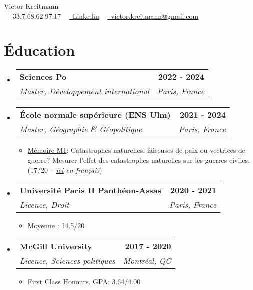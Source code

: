 \documentclass[a4paper,11pt]{article}
\makeatletter
\newcommand{\resumeItem}[1]{
  \item\small{
    {#1 \vspace{-2pt}}
  }
}
\newcommand{\resumeSubheading}[4]{
  \vspace{-2pt}\item
    \begin{tabular*}{1.00\textwidth}[t]{l@{\extracolsep{\fill}}r}
      \textbf{{\small #1}} & {\textbf{\small #2}} \\
      \textit{\small#3} & \textit{\small #4} \\
    \end{tabular*}\vspace{-7pt}
}
\newcommand{\resumeSubHeadingListStart}{\begin{itemize}[leftmargin=0.0in, label={}]}
\newcommand{\resumeSubHeadingListEnd}{\end{itemize}}
\newcommand{\resumeItemListStart}{\begin{itemize}}
\newcommand{\resumeItemListEnd}{\end{itemize}\vspace{-5pt}}
\makeatother
\begin{document}

\begin{center}
    {\Huge Victor Kreitmann} \\ \vspace{1pt}
    \small \raisebox{-0.1\height}\faPhone\ +33.7.68.62.97.17 ~
    \href{https://www.linkedin.com/in/victor-kreitmann/}{\raisebox{-0.2\height}\faLinkedin\ \underline{Linkedin}}  ~    
    \href{mailto:victor.kreitmann@gmail.com}{\raisebox{-0.2\height}\faEnvelope\  \underline{victor.kreitmann@gmail.com}} ~ 
    \vspace{0pt}
\end{center}




\section{Éducation}
  \resumeSubHeadingListStart
    \resumeSubheading
      {Sciences Po}{2022 - 2024}
      {Master, Développement international}{Paris, France}
      
      \resumeSubheading
      {École normale supérieure (ENS Ulm)}{2021 - 2024}
      {Master, Géographie \& Géopolitique}{Paris, France}
      \resumeItemListStart
      \resumeItem{\underline{Mémoire M1}: Catastrophes naturelles: faiseuses de paix ou vectrices de guerre? Mesurer l'effet des catastrophes naturelles sur les guerres civiles. (17/20 – \emph{\href{https://drive.google.com/file/d/1O6ke_2wZjExpSnBBnSKN7shPb0E3ZBgg/view?usp=sharing}{\underline{ici}} en français})}
      \resumeItemListEnd
      
      \resumeSubheading
      {Université Paris II Panthéon-Assas}{2020 - 2021}
      {Licence, Droit}{Paris, France}
      \resumeItemListStart
      \resumeItem{Moyenne : 14.5/20}
      \resumeItemListEnd
      
      \resumeSubheading
      {McGill University}{2017 - 2020}
      {Licence, Sciences politiques}{Montréal, QC}
      \resumeItemListStart
      \resumeItem{First Class Honours. GPA: 3.64/4.00}
      \resumeItemListEnd
  \resumeSubHeadingListEnd
\vspace{-10pt}
\end{document}
